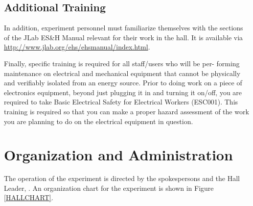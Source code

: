 \documentclass[11pt]{article}
\begin{document}
\subsection{Additional Training}
In addition, experiment personnel must familiarize themselves with the 
sections of the JLab ES\&H Manual relevant for their work in the hall.  It is
available via \url{http://www.jlab.org/ehs/ehsmanual/index.html}.

Finally, specific training is required for all staff/users who will be per- forming maintenance on electrical and 
mechanical equipment that cannot be physically and verifiably isolated from an energy source. Prior to 
doing work on a piece of electronics equipment, beyond just plugging it in and turning it on/off, you are 
required to take Basic Electrical Safety for Electrical Workers (ESC001). This training is required so 
that you can make a proper hazard assessment of the work you are planning to do on the electrical 
equipment in question.


%

\section{ Organization  and Administration}
\indent

The operation of the experiment is directed by the spokespersons and the Hall 
Leader, \HALLLEADER. An organization chart for the experiment is
shown in Figure \ref{HALLCHART}.
\end{document}
